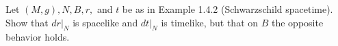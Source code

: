 Let $(M, g), N, B, r,$ and $t$ be as in Example 1.4.2 (Schwarzschild spacetime). Show that $dr|_N$ is spacelike and $dt|_N$ is timelike, but that on $B$ the opposite behavior holds.
